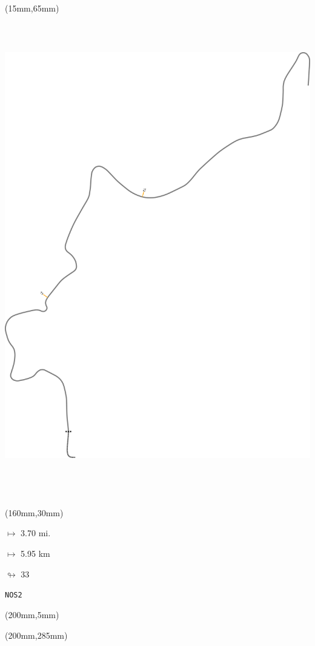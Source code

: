 \begin{textblock*}{185mm}(15mm,65mm)%
\centering
\mbox{\includegraphics[width=185mm,height=210mm,keepaspectratio]{PT/NOS2.pdf}}
\end{textblock*}
\begin{textblock*}{40mm}(160mm,30mm)%
\Large
\par$\mapsto$ 3.70 mi.
\par$\mapsto$ 5.95 km
\par$\looparrowright$ 33
\par\hfill\tiny\tt NOS2\\
\end{textblock*}
\begin{textblock*}{20mm}(200mm,5mm)%
\fbox{\thepage}
\label{NOS2}
\end{textblock*}
\begin{textblock*}{20mm}(200mm,285mm)%
\fbox{\thepage}
\end{textblock*}


